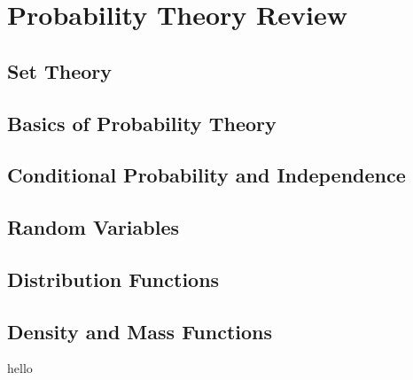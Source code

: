 \section{Probability Theory Review}
\subsection{Set Theory}

\begin{definition}
\end{definition}



\subsection{Basics of Probability Theory}

\subsection{Conditional Probability and Independence}

\subsection{Random Variables}

\subsection{Distribution Functions}

\subsection{Density and Mass Functions}

\begin{question}
hello
\end{question}